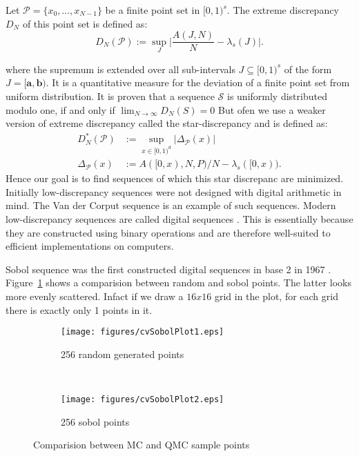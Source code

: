 \theoremstyle{definition}
\begin{definition}{}
Let $\mathscr{P} =\{x_0,\dots,x_{N−1}\}$ be a finite point set in $[0, 1)^s$.
The extreme discrepancy $D_N$ of this point set is defined as:
\[
    D_N(\mathscr{P}) := \sup_{J}\Big| \frac{A(J, N)}{N}-\lambda_s(J)\Big|.
\]
\end{definition}
where the supremum is extended over all sub-intervals $J \subseteq [0, 1)^s$ of the form $J=[\mathbf{a},\mathbf{b})$.
It is a quantitative measure for the deviation of a finite point set from uniform distribution.
It is proven that a sequence $\mathcal{S}$ is uniformly distributed modulo one, if and only if $\lim_{N\to\infty} D_ N(S) = 0$
But ofen we use a weaker version of extreme discrepancy called the star-discrepancy and is defined as:
\begin{align*}
    D^*_N(\mathscr{P})&:=\sup_{x\in[0,1)^d}|\Delta_{\mathscr{P}}(x)|\\
    \Delta_{\mathscr{P}}(x)&:=A([0,x),N,P)/N - \lambda_s([0,x)).
\end{align*}
Hence our goal is to find sequences of which this star discrepanc are minimized.
Initially low-discrepancy sequences were not designed with digital arithmetic in mind. 
The Van der Corput sequence \cite{halton1960efficiency} is an example of such sequences.
Modern low-discrepancy sequences are called digital sequences \cite{l2005recent}. This is essentially because they are constructed using binary operations and are therefore well-suited to efficient implementations on computers.

Sobol sequence was the first constructed digital sequences in base 2 in 1967 \cite{dick2010digital}.
Figure~\ref{fg:sobol} shows a comparision between random and sobol points. The latter looks more evenly scattered. Infact if we draw a $16x16$ grid in the plot, for each grid there is exactly only 1 points in it.   
\begin{figure}
    \centering
    \begin{subfigure}[b]{.5\textwidth}
    \texttt{[image: figures/cvSobolPlot1.eps]}
    \caption{256 random generated points}
    \end{subfigure}~\begin{subfigure}[b]{.5\textwidth}
    \texttt{[image: figures/cvSobolPlot2.eps]}
    \caption{256 sobol points}
    \end{subfigure}
    \caption{Comparision between MC and QMC sample points}\label{fg:sobol}
\end{figure}

